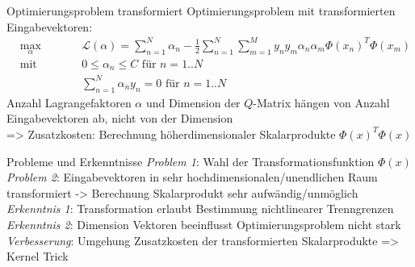 \documentclass[ngerman]{beamer}
\newcommand{\Lagr}{\mathcal{L}}
\begin{document}
\begin{frame}{Optimierungsproblem transformiert}
Optimierungsproblem mit transformierten Eingabevektoren: \\ \pause
\begin{subequations} \label{eq:soft_margin_with_transform_pres}
\begin{alignat*}{2}
    &\!\max_{\alpha}        &\qquad&  	\Lagr(\alpha) = \sum_{n=1}^{N} \alpha_{n} - \frac{1}{2} \sum_{n=1}^{N} \sum_{m=1}^{M} y_{n} y_{m} \alpha_{n} \alpha_{m} \Phi(x_{n})^{T} \Phi(x_{m})\\
    &\text{mit } &      & 0 \leq \alpha_{n} \leq C \text{ für } n=1..N\\
    &       & & \sum_{n=1}^{N} \alpha_{n} y_{n} = 0\text{ für } n=1..N
\end{alignat*}
\end{subequations} \pause
    Anzahl Lagrangefaktoren $\alpha$ und Dimension der $Q$-Matrix hängen von Anzahl Eingabevektoren ab, nicht von der Dimension \\ \pause
    => Zusatzkosten: Berechnung höherdimensionaler Skalarprodukte $\Phi(x)^{T} \Phi(x)$
\end{frame}

\begin{frame}{Probleme und Erkenntnisse}
    \emph{Problem 1}: Wahl der Transformationsfunktion $\Phi(x)$ \\ \pause
    \emph{Problem 2}: Eingabevektoren in sehr hochdimensionalen/unendlichen Raum transformiert -> Berechnung Skalarprodukt sehr aufwändig/unmöglich \\ \pause
    \emph{Erkenntnis 1}: Transformation erlaubt Bestimmung nichtlinearer Trenngrenzen \\ \pause
    \emph{Erkenntnis 2}: Dimension Vektoren beeinflusst Optimierungsproblem nicht stark \\ \pause
    \emph{Verbesserung}: Umgehung Zusatzkosten der transformierten Skalarprodukte => Kernel Trick
\end{frame}
\end{document}
